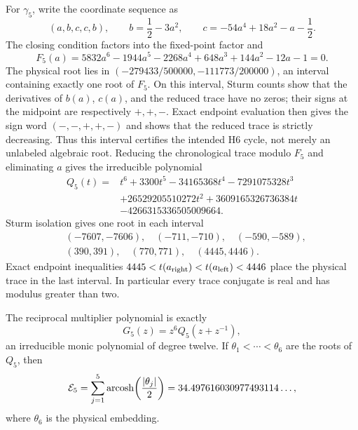 For \(\gamma_5\), write the coordinate sequence as
\begin{equation}\label{eq:p5-pattern}
 (a,b,c,c,b),\qquad
 b=\frac12-3a^2,\qquad
 c=-54a^4+18a^2-a-\frac12.
\end{equation}
The closing condition factors into the fixed-point factor and
\begin{equation}\label{eq:p5-coordinate-poly}
 F_5(a)=5832a^6-1944a^5-2268a^4+648a^3+144a^2-12a-1=0.
\end{equation}
The physical root lies in
\((-279433/500000,-111773/200000)\), an interval containing exactly one
root of \(F_5\).  On this interval, Sturm counts show that the derivatives
of \(b(a)\), \(c(a)\), and the reduced trace have no zeros; their signs at
the midpoint are respectively \(+,+,-\).  Exact endpoint evaluation then
gives the sign word \((-,-,+,+,-)\) and shows that the reduced trace is
strictly decreasing.  Thus this interval certifies the intended H6 cycle,
not merely an unlabeled algebraic root.  Reducing the chronological trace modulo \(F_5\) and
eliminating \(a\) gives the irreducible polynomial
\begin{align}\label{eq:p5-trace-poly}
 Q_5(t)={}&t^6+3300t^5-34165368t^4-7291075328t^3\\
 &+26529205510272t^2+3609165326736384t\\
 &-4266315336505009664.
\end{align}
Sturm isolation gives one root in each interval
\begin{equation}\label{eq:trace-intervals}
\begin{split}
 &(-7607,-7606),\quad(-711,-710),\quad(-590,-589),\\
 &(390,391),\quad(770,771),\quad(4445,4446).
\end{split}
\end{equation}
Exact endpoint inequalities
\(4445<t(a_{\rm right})<t(a_{\rm left})<4446\) place the physical trace in
the last interval.  In particular every trace
conjugate is real and has modulus greater than two.

The reciprocal multiplier polynomial is exactly
\begin{equation}\label{eq:p5-multiplier}
 G_5(z)=z^6Q_5(z+z^{-1}),
\end{equation}
an irreducible monic polynomial of degree twelve.  If
\(\theta_1<\cdots<\theta_6\) are the roots of \(Q_5\), then
\begin{equation}\label{eq:p5-excess}
 \mathcal E_5=\sum_{j=1}^{5}
 \operatorname{arcosh}\!\left(\frac{|\theta_j|}{2}\right)
 =34.497616030977493114\ldots,
\end{equation}
where \(\theta_6\) is the physical embedding.

